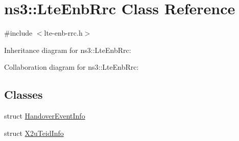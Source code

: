 \hypertarget{classns3_1_1LteEnbRrc}{}\section{ns3\+:\+:Lte\+Enb\+Rrc Class Reference}
\label{classns3_1_1LteEnbRrc}


{\ttfamily \#include $<$lte-\/enb-\/rrc.\+h$>$}



Inheritance diagram for ns3\+:\+:Lte\+Enb\+Rrc\+:


Collaboration diagram for ns3\+:\+:Lte\+Enb\+Rrc\+:
\subsection*{Classes}
\begin{DoxyCompactItemize}
\item 
struct \hyperlink{structns3_1_1LteEnbRrc_1_1HandoverEventInfo}{Handover\+Event\+Info}
\item 
struct \hyperlink{structns3_1_1LteEnbRrc_1_1X2uTeidInfo}{X2u\+Teid\+Info}
\end{DoxyCompactItemize}
